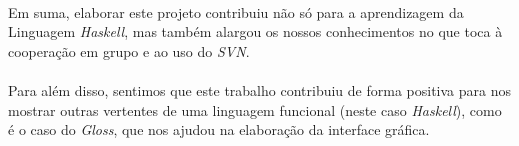 \documentclass[12pt,a4paper]{report}
\begin{document}
\paragraph{} Em suma, elaborar este projeto contribuiu não só para a aprendizagem da Linguagem \textit{Haskell}, mas também alargou os nossos conhecimentos no que toca à cooperação em grupo e ao uso do \textit{SVN}.
\paragraph{} Para além disso, sentimos que este trabalho contribuiu de forma positiva para nos mostrar outras vertentes de uma linguagem funcional (neste caso \textit{Haskell}), como é o caso do \textit{Gloss}, que nos ajudou na elaboração da interface gráfica. 



  
\end{document}
